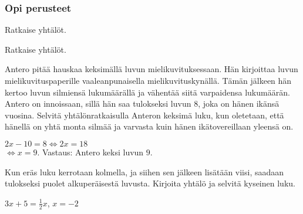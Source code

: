 \begin{tehtavasivu}

\subsubsection*{Opi perusteet}

\begin{tehtava}
    Ratkaise yhtälöt.
    \begin{vastaus}
    \end{vastaus}
\end{tehtava}

\begin{tehtava}
    Ratkaise yhtälöt.
    \begin{vastaus}
    \end{vastaus}
\end{tehtava}

\begin{tehtava}
    Antero pitää hauskaa keksimällä luvun mielikuvituksessaan. Hän kirjoittaa luvun mielikuvituspaperille vaaleanpunaisella mielikuvituskynällä. Tämän jälkeen hän kertoo luvun silmiensä lukumäärällä ja vähentää siitä varpaidensa lukumäärän. Antero on innoissaan, sillä hän saa tulokseksi luvun $8$, joka on hänen ikänsä vuosina. Selvitä yhtälönratkaisulla Anteron keksimä luku, kun oletetaan, että hänellä on yhtä monta silmää ja varvasta kuin hänen ikätovereillaan yleensä on.
    \begin{vastaus}
        $2x-10=8 \Leftrightarrow 2x=18$ \\ $\Leftrightarrow x=9$. Vastaus: Antero keksi luvun $9$.
    \end{vastaus}
\end{tehtava}

\begin{tehtava}
    Kun eräs luku kerrotaan kolmella, ja siihen sen jälkeen lisätään viisi, saadaan tulokseksi puolet alkuperäisestä luvusta. Kirjoita yhtälö ja selvitä kyseinen luku.
    \begin{vastaus}
        $3x+5=\frac12x$, $x=-2$
    \end{vastaus}
\end{tehtava}


\end{tehtavasivu}

